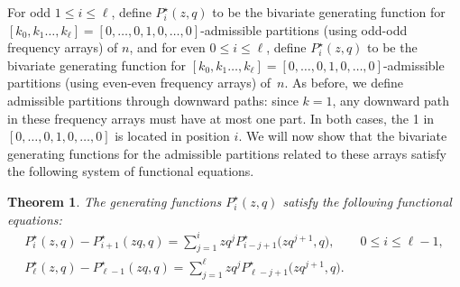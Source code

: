 \documentclass[10pt,a4paper]{amsart}
\numberwithin{equation}{section}
\newtheorem{Theorem}{Theorem}[section]
\theoremstyle{definition}
\begin{document}
For odd $1 \le i \le \ell$, define $P^\star_i(z,q)$ to be the bivariate generating function for $[k_0,k_1\dots,k_\ell]=[0,\dots,0,1,0,\dots,0]$-admissible partitions (using odd-odd frequency arrays) of $n$, and for even ${0 \le i \le \ell}$, define $P^\star_i(z,q)$ to be the bivariate generating function for $[k_0,k_1\dots,k_\ell]=[0,\dots,0,1,\allowbreak 0,\dots,0]$-admissible partitions (using even-even frequency arrays) of~$n$. As before, we define admissible partitions through downward paths: since $k=1$, any downward path in these frequency arrays must have at most one part. In both cases, the 1 in $[0,\dots,0,1,0,\dots,0]$ is located in position $i$. We will now show that the bivariate generating functions for the admissible partitions related to these arrays satisfy the following system of functional equations.
\begin{Theorem}\label{thm:funceq1B}
The generating functions $P^\star_i(z,q)$ satisfy the following functional equations:
\begin{gather*}
P^\star_i(z,q) - P^\star_{i+1}(zq,q) = \sum_{j=1}^i zq^j P^\star_{i-j+1}\bigl(zq^{j+1},q\bigr), \qquad 0 \le i \le \ell-1, \\
P^\star_\ell(z,q) - P^\star_{\ell-1}(zq,q) = \sum_{j=1}^\ell zq^j P^\star_{\ell-j+1}\bigl(zq^{j+1},q\bigr).
\end{gather*}
\end{Theorem}
\end{document}
